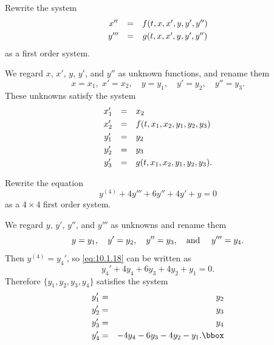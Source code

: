 \setcounter{example}{4}
\begin{example}
  \label{example:10.1.5} \rm Rewrite the system
  \[
    \begin{array}{ccc}
      x''  & = & f(t,x,x',y,y',y'') \\[1\jot]
      y''' & = & g(t,x,x',y,y',y'')
    \end{array}
  \]
  as a first order system.
\end{example}
\begin{examplesolution}
\solution We regard $x$, $x'$, $y$, $y'$, and $y''$ as unknown functions, and rename them
\[
  x=x_{1},\;x'=x_{2},\quad y=y_{1},\quad y'=y_{2},\quad y''=y_{3}.
\]
These unknowns satisfy the system
\[
  \begin{array}{ccl}
    x_{1}' & = & x_{2}                               \\[1\jot]
    x_{2}' & = & f(t,x_{1},x_{2},y_{1},y_{2},y_{3})  \\[1\jot]
    y_{1}' & = & y_{2}                               \\[1\jot]
    y_{2}' & = & y_{3}                               \\[1\jot]
    y_{3}' & = & g(t,x_{1},x_{2},y_{1},y_{2},y_{3}).
  \end{array}
\]
\end{examplesolution}

\setcounter{example}{5}
\setcounter{equation}{17}
\begin{example}
  \label{example:10.1.6} \rm Rewrite the equation
  \begin{equation}
    \label{eq:10.1.18}y^{(4)}+4y'''+6y''+4y'+y=0
  \end{equation}
  as a $4\times4$ first order system.
\end{example}
\begin{examplesolution}
\solution We regard $y$, $y'$, $y''$, and $y'''$ as unknowns and rename them
\[
  y=y_{1},\quad y'=y_{2},\quad y''=y_{3},\mbox{\quad and \quad}y'''=y_{4}.
\]
Then $y^{(4)}=y_{4}'$, so \eqref{eq:10.1.18} can be written as
\[
  y_{4}'+4y_{4}+6y_{3}+4y_{2}+y_{1}=0.
\]
Therefore $\{y_{1},y_{2},y_{3},y_{4}\}$ satisfies the system
\begin{eqnarray*}
  y_{1}' & = & y_{2} \\
  y_{2}' & = & y_{3} \\
  y_{3}' & = & y_{4} \\
  y_{4}' & = & -4y_{4}-6y_{3}-4y_{2}-y_{1}.\bbox
\end{eqnarray*}
\end{examplesolution}

